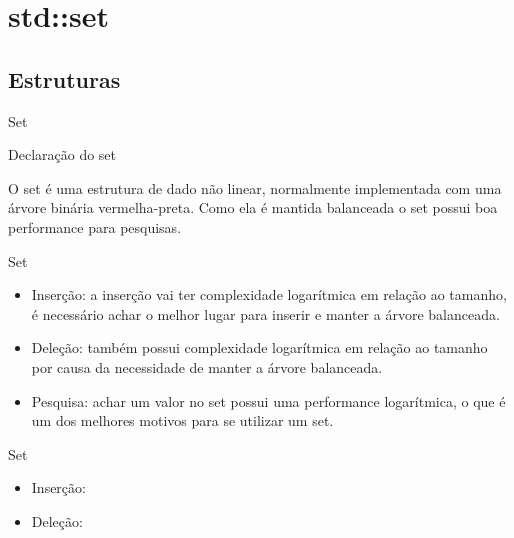 \section{std::set}

\subsection{Estruturas}

\begin{frame}[fragile]{Set}

    \begin{block}{Declaração do set}
    \end{block}
	
    O set é uma estrutura de dado não linear, normalmente implementada com uma árvore binária vermelha-preta. Como ela é mantida balanceada o set possui boa performance para pesquisas.
         
\end{frame}

\begin{frame}[fragile]{Set}

    \begin{itemize}
        \item Inserção: a inserção vai ter complexidade logarítmica em relação ao tamanho, é necessário achar o melhor lugar para inserir e manter a árvore balanceada. 
        \item Deleção: também possui complexidade logarítmica em relação ao tamanho por causa da necessidade de manter a árvore balanceada.
        \item Pesquisa: achar um valor no set possui uma performance logarítmica, o que é um dos melhores motivos para se utilizar um set.
    \end{itemize}

\end{frame}

\begin{frame}[fragile]{Set}

    \begin{itemize}
        \item Inserção:
        \item Deleção:
    \end{itemize}

\end{frame}

